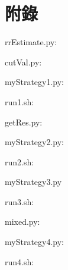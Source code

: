 \section{附錄}

rrEstimate.py:

cutVal.py:

myStrategy1.py:

run1.sh:

getRes.py:

myStrategy2.py:

run2.sh:

myStrategy3.py

run3.sh:

mixed.py:

myStrategy4.py:

run4.sh:

